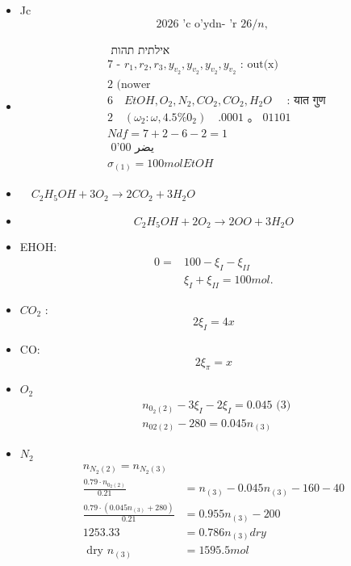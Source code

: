\documentclass[12pt]{article}
\begin{document}

\begin{itemize}\item[1.] Jc
\[
2026 \text { 'c o'ydn- 'r } 26 / n \text {, }
\]
\item[]
\[
\begin{aligned}
& \text { אילתית תהות } \\
& 7 \text { - } r_{1}, r_{2}, r_{3}, y_{v_{2}}, y_{v_{2}}, y_{v_{2}}, y_{v_{2}} \text { : out(x) } \\
& 2 \text { (nower } \\
& 6 \quad EtOH, O_{2}, N_{2}, CO_{2}, CO_{2}, H_{2} O \quad \text { : यात गुण } \\
& 2 \quad\left(\omega_{2}: \omega, 4.5 \% 0_{2}\right) \quad .0001 \text { 。 } 01101 \\
& N d f=7+2-6-2=1 \\
& \text { 0'00 يضر } \\
& \sigma_{(1)}=100 mol EtOH
\end{aligned}
\]
\item[I)] \(\quad C _{2} H _{5} OH +3 O _{2} \longrightarrow 2 CO _{2}+3 H _{2} O\)
\item[II)]
\[
C_{2} H_{5} OH+2 O_{2} \rightarrow 2 OO+3 H_{2} O
\]
\item[] EHOH:
\[
\begin{aligned}
0= & 100-\xi_{I}-\xi_{I I} \\
& \xi_{I}+\xi_{I I}=100 mol .
\end{aligned}
\]
\item[] \(CO _{2}\) :
\[
2 \xi_{I}=4 x
\]
\item[] CO:
\[
2 \xi_{\pi}=x
\]
\item[] \(O _{2}\)
\[
\begin{aligned}
& n_{0_{2}(2)}-3 \xi_{I}-2 \xi_{I}=0.045 \text { (3) } \\
& n_{02(2)}-280=0.045 n_{(3)}
\end{aligned}
\]
\item[] \(N _{2}\)
\[
\begin{aligned}
n_{N_{2}(2)}=n_{N_{2}(3)} & \\
\frac{0.79 \cdot n_{0_{2}(2)}}{0.21} & =n_{(3)}-0.045 n_{(3)}-160-40 \\
\frac{0.79 \cdot\left(0.045 n_{(3)}+280\right)}{0.21} & =0.955 n_{(3)}-200 \\
1253.33 & =0.786 n_{(3)} dry \\
\text { dry } n_{(3)} & =1595.5 mol
\end{aligned}
\]
\end{itemize}
\end{document}
